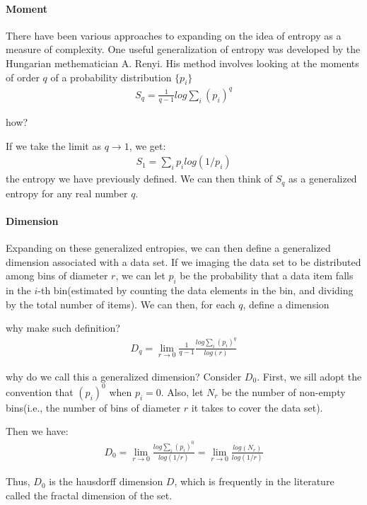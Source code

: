 \documentclass[10 pt,final]{article}
\newcommand{\impo}[1]{{\color{magenta} #1}}
\newcommand{\question}[1]{{\color{blue} #1}}
\begin{document}
\paragraph{Moment}
There have been various approaches to expanding on the idea of entropy as a measure of complexity. One useful generalization of entropy was developed by the Hungarian methematician A. Renyi. His method involves looking at \question{the moments} of order $q$ of a probability distribution $\{p_i\}$
\begin{align*}
S_q = \frac{1}{q-1}log \sum_i (p_i)^q
\end{align*}


\question{how?}

If we take the limit as $q \to 1$, we get:
\begin{align*}
S_1 = \sum_i p_i log(1/p_i)
\end{align*}
the entropy we have previously defined. We can then think of \impo{$S_q$ as a generalized entropy for any real number $q$.}

\paragraph{Dimension} Expanding on these generalized entropies, we can then define a generalized dimension associated with a data set. If we imaging the data set to be distributed among bins of diameter $r$, we can let $p_i$ be the probability that a data item falls in the $i$-th bin(estimated by counting the data elements in the bin, and dividing by the total number of items). We can then, for each $q$, define a dimension

\question{why make such definition?}
\begin{align*}
D_q = \lim_{r \to 0} \frac{1}{q-1} \frac{log \sum_i (p_i)^q}{log(r)}
\end{align*}

\impo{why do we call this a generalized dimension?} Consider $D_0$. First, we sill adopt the convention that $(p_i)^0$ when $p_i = 0$. Also, let $N_r$ be the number of non-empty bins(i.e., the number of bins of diameter $r$ it takes to cover the data set).

Then we have:
\begin{align*}
D_0 = \lim_{r \to 0} \frac{log \sum_i (p_i)^0}{log(1/r)} = \lim_{r \to 0} \frac{log(N_r)}{log(1/r)}
\end{align*}

Thus, $D_0$ is the hausdorff dimension $D$, which is frequently in the literature called the \impo{fractal dimension} of the set.
\end{document}
